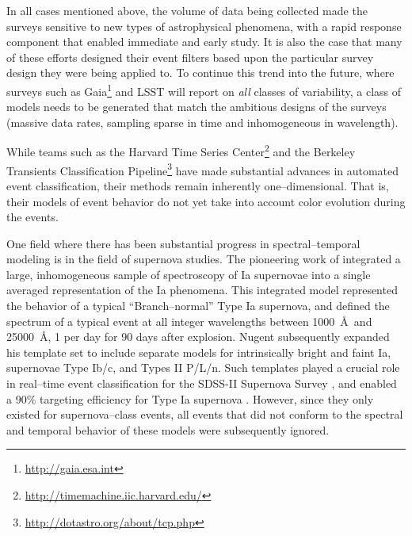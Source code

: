 In all cases mentioned above, the volume of data being collected made the
surveys sensitive to new types of astrophysical phenomena, with a rapid response
component that enabled immediate and early study.  It is also the case that many
of these efforts designed their event filters based upon the particular survey
design they were being applied to.  To continue this trend into the future,
where surveys such as Gaia\footnote{\url{http://gaia.esa.int}} and LSST will
report on {\it all} classes of variability, a class of models needs to be
generated that match the ambitious designs of the surveys (massive data rates,
sampling sparse in time and inhomogeneous in wavelength).

 \smallskip

While teams such as the Harvard Time Series
Center\footnote{\url{http://timemachine.iic.harvard.edu/}} and the Berkeley
Transients Classification
Pipeline\footnote{\url{http://dotastro.org/about/tcp.php}} have made substantial
advances in automated event classification, their methods remain inherently
one--dimensional. That is, their models of event behavior do not yet take into
account color evolution during the events.

One field where there has been substantial progress in spectral--temporal
modeling is in the field of supernova studies. The pioneering work of
\cite{2002PASP..114..803N} integrated a large, inhomogeneous sample of
spectroscopy of Ia supernovae into a single averaged representation of the Ia
phenomena. This integrated model represented the behavior of a typical
``Branch--normal'' Type Ia supernova, and defined the spectrum of a typical
event at all integer wavelengths between 1000~\AA~and 25000~\AA, 1 per day for
90 days after explosion.  Nugent subsequently expanded his template set to
include separate models for intrinsically bright and faint Ia, supernovae Type
Ib/c, and Types II P/L/n. Such templates played a crucial role in real--time
event classification for the SDSS-II Supernova Survey
\citep{2008AJ....135..338F}, and enabled a $90\%$ targeting efficiency for Type
Ia supernova \citep{2008AJ....135..348S}. However, since they only existed for
supernova--class events, all events that did not conform to the spectral and
temporal behavior of these models were subsequently ignored.


